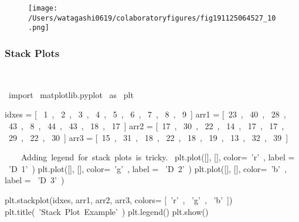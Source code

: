 \begin{figure}[H]
\centering
\texttt{[image: /Users/watagashi0619/colaboratoryfigures/fig191125064527\_10.png]}
\end{figure}
\subsubsection{Stack Plots}

\begin{paracol}{2}
\smallskip
\begin{cellExecute}[escapechar=~]
~~
\end{cellExecute}
\switchcolumn
\begin{codeCell}[escapechar=~]
~\textcolor{mtk17}{import}~ matplotlib.pyplot ~\textcolor{mtk17}{as}~ plt

idxes = [ ~\textcolor{mtk7}{1}~,  ~\textcolor{mtk7}{2}~,  ~\textcolor{mtk7}{3}~,  ~\textcolor{mtk7}{4}~,  ~\textcolor{mtk7}{5}~,  ~\textcolor{mtk7}{6}~,  ~\textcolor{mtk7}{7}~,  ~\textcolor{mtk7}{8}~,  ~\textcolor{mtk7}{9}~]
arr1  = [~\textcolor{mtk7}{23}~, ~\textcolor{mtk7}{40}~, ~\textcolor{mtk7}{28}~, ~\textcolor{mtk7}{43}~,  ~\textcolor{mtk7}{8}~, ~\textcolor{mtk7}{44}~, ~\textcolor{mtk7}{43}~, ~\textcolor{mtk7}{18}~, ~\textcolor{mtk7}{17}~]
arr2  = [~\textcolor{mtk7}{17}~, ~\textcolor{mtk7}{30}~, ~\textcolor{mtk7}{22}~, ~\textcolor{mtk7}{14}~, ~\textcolor{mtk7}{17}~, ~\textcolor{mtk7}{17}~, ~\textcolor{mtk7}{29}~, ~\textcolor{mtk7}{22}~, ~\textcolor{mtk7}{30}~]
arr3  = [~\textcolor{mtk7}{15}~, ~\textcolor{mtk7}{31}~, ~\textcolor{mtk7}{18}~, ~\textcolor{mtk7}{22}~, ~\textcolor{mtk7}{18}~, ~\textcolor{mtk7}{19}~, ~\textcolor{mtk7}{13}~, ~\textcolor{mtk7}{32}~, ~\textcolor{mtk7}{39}~]

~~~\textcolor{mtk8}{ Adding legend for stack plots is tricky.}~
plt.plot([], [], color=~\textcolor{mtk25}{'r'}~, label = ~\textcolor{mtk25}{'D 1'}~)
plt.plot([], [], color=~\textcolor{mtk25}{'g'}~, label = ~\textcolor{mtk25}{'D 2'}~)
plt.plot([], [], color=~\textcolor{mtk25}{'b'}~, label = ~\textcolor{mtk25}{'D 3'}~)

plt.stackplot(idxes, arr1, arr2, arr3, colors= [~\textcolor{mtk25}{'r'}~, ~\textcolor{mtk25}{'g'}~, ~\textcolor{mtk25}{'b'}~])
plt.title(~\textcolor{mtk25}{'Stack Plot Example'}~)
plt.legend()
plt.show()
\end{codeCell}
\end{paracol}

\begin{paracol}{2}
\begin{cellExecute}[escapechar=~]
~~
\end{cellExecute}
\switchcolumn
\begin{resultCell}[escapechar=~]
\end{resultCell}
\end{paracol}

